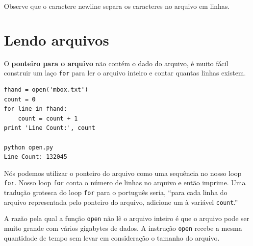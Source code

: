 Observe que o caractere newline separa os caracteres
no arquivo em linhas.

\section{Lendo arquivos}


O {\bf ponteiro para o arquivo} não contém o dado do arquivo,
é muito fácil construir um laço {\tt for} para ler o arquivo inteiro
e contar quantas linhas existem.

\beforeverb
\begin{verbatim}
fhand = open('mbox.txt')
count = 0
for line in fhand:
    count = count + 1
print 'Line Count:', count

python open.py 
Line Count: 132045
\end{verbatim}
\afterverb

Nós podemos utilizar o ponteiro do arquivo como uma sequência no nosso
loop {\tt for}. Nosso loop {\tt for} conta o número de linhas no
arquivo e então imprime. Uma tradução grotesca do loop {\tt for} para
o português seria, ``para cada linha do arquivo representada pelo ponteiro
do arquivo, adicione um à variável {\tt count}.''

A razão pela qual a função {\tt open} não lê o arquivo inteiro é que
o arquivo pode ser muito grande com vários gigabytes de dados.
A instrução {\tt open} recebe a mesma quantidade de tempo sem levar em
consideração o tamanho do arquivo.

